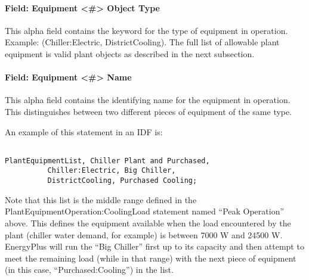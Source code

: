 \paragraph{Field: Equipment \textless{}\#\textgreater{} Object Type}\label{field-equipment-object-type-1}

This alpha field contains the keyword for the type of equipment in operation. Example: (Chiller:Electric, DistrictCooling). The full list of allowable plant equipment is valid plant objects as described in the next subsection.

\paragraph{Field: Equipment \textless{}\#\textgreater{} Name}\label{field-equipment-name-1}

This alpha field contains the identifying name for the equipment in operation. This distinguishes between two different pieces of equipment of the same type.

An example of this statement in an IDF is:

\begin{lstlisting}

PlantEquipmentList, Chiller Plant and Purchased,
          Chiller:Electric, Big Chiller,
          DistrictCooling, Purchased Cooling;
\end{lstlisting}

Note that this list is the middle range defined in the PlantEquipmentOperation:CoolingLoad statement named ``Peak Operation'' above. This defines the equipment available when the load encountered by the plant (chiller water demand, for example) is between 7000 W and 24500 W. EnergyPlus will run the ``Big Chiller'' first up to its capacity and then attempt to meet the remaining load (while in that range) with the next piece of equipment (in this case, ``Purchased:Cooling'') in the list.

